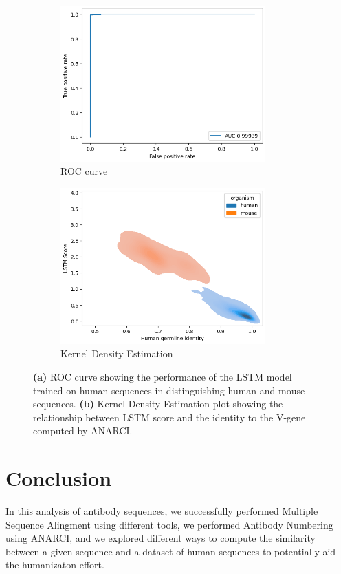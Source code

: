 \documentclass[11pt]{article}
\begin{document}
\begin{figure}[h]
	
	\begin{subfigure}{0.5\textwidth}
		\includegraphics[width=0.9\linewidth, height=6cm]{images/ROC.png} 
		\caption{\small ROC curve}
		\label{fig:roc}
	\end{subfigure}
	\begin{subfigure}{0.5\textwidth}
		\includegraphics[width=0.9\linewidth, height=6cm]{images/score_vs_identity.png}
		\caption{\small Kernel Density Estimation}
		\label{fig:kernel}
	\end{subfigure}
	
	\caption{\small \textbf{(a)} ROC curve showing the performance of the LSTM model trained on human sequences in distinguishing human and mouse sequences. \textbf{(b)} Kernel Density Estimation plot showing the relationship between LSTM score and the identity to the V-gene computed by ANARCI.}
	\label{fig:roc_kernel}
\end{figure}



\newpage
\section{Conclusion}

In this analysis of antibody sequences, we successfully performed Multiple Sequence Alingment using different tools, we performed Antibody Numbering using ANARCI, and we explored different ways to compute the similarity between a given sequence and a dataset of human sequences to potentially aid the humanizaton effort. 
\end{document}
